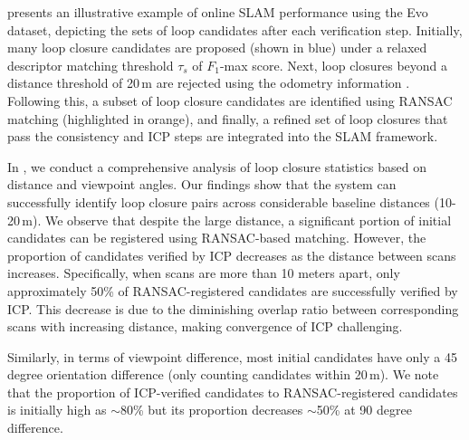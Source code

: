 presents an illustrative example of online SLAM performance using the Evo dataset, depicting the sets of loop candidates after each verification step. Initially, many loop closure candidates are proposed (shown in blue) under a relaxed descriptor matching threshold $\tau_{s}$ of  $F_1$-max score. Next, loop closures beyond a distance threshold of 20\,m are rejected using the odometry information . Following this, a subset of loop closure candidates are identified using RANSAC matching (highlighted in orange), and finally, a refined set of loop closures that pass the consistency and ICP steps are integrated into the SLAM framework.

In , we conduct a comprehensive analysis of loop closure statistics based on distance and viewpoint angles. Our findings show that the system can successfully identify loop closure pairs across considerable baseline distances (10-20\,m). We observe that despite the large distance, a significant portion of initial candidates can be registered using RANSAC-based matching. However, the proportion of candidates verified by ICP decreases as the distance between scans increases. Specifically, when scans are more than 10 meters apart, only approximately 50\% of RANSAC-registered candidates are successfully verified by ICP. This decrease is due to the diminishing overlap ratio between corresponding scans with increasing distance, making convergence of ICP challenging.

Similarly, in terms of viewpoint difference, most initial candidates have only a 45 degree orientation difference (only counting candidates within 20\,m). We note that the proportion of ICP-verified candidates to RANSAC-registered candidates is initially high as $\sim$80\% but its proportion decreases  $\sim$50\% at 90 degree difference. 

